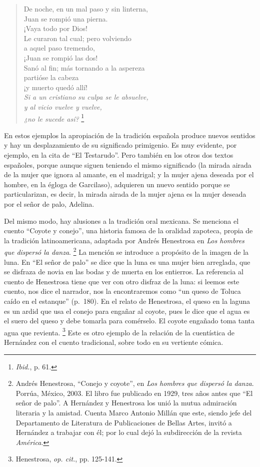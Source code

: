 \documentclass[14pt,twoside,final]{extbook} %
\let\oldfootnote\footnote
\renewcommand\footnote[1]{%
\oldfootnote{\hspace{1mm}#1}}
\begin{document}
\begin{verse}
De noche, en un mal paso y sin linterna, \\
Juan se rompió una pierna. \\
¡Vaya todo por Dios! \\
Le curaron tal cual; pero volviendo \\
a aquel paso tremendo, \\
¡Juan se rompió las dos! \\
Sanó al fin; más tornando a la aspereza \\
partióse la cabeza \\
¡y muerto quedó allí! \\
\emph{Si a un cristiano su culpa se le absuelve, \\
y al vicio vuelve y vuelve, \\
¿no le sucede así?}\footnote{\emph{Ibid.}, p. 61.}
\end{verse}
En estos ejemplos la apropiación de la tradición española produce nuevos sentidos y hay un desplazamiento de su significado primigenio. Es muy evidente, por ejemplo, en la cita de ``El Testarudo''. Pero también en los otros dos textos españoles, porque aunque siguen teniendo el mismo significado (la mirada airada de la mujer que ignora al amante, en el madrigal; y la mujer ajena deseada por el hombre, en la égloga de Garcilaso), adquieren un nuevo sentido porque se particularizan, es decir, la mirada airada de la mujer ajena es la mujer deseada por el señor de palo, Adelina.

Del mismo modo, hay alusiones a la tradición oral mexicana. Se menciona el cuento ``Coyote y conejo'', una historia famosa de la oralidad zapoteca, propia de la tradición latinoamericana, adaptada por Andrés Henestrosa en \emph{Los hombres que dispersó la danza}.\footnote{Andrés Henestrosa, ``Conejo y coyote'', en \emph{Los hombres que dispersó la danza}. Porrúa, México, 2003. El libro fue publicado en 1929, tres años antes que ``El señor de palo''. A Hernández y Henestrosa los unió la mutua admiración literaria y la amistad. Cuenta Marco Antonio Millán que este, siendo jefe del Departamento de Literatura de Publicaciones de Bellas Artes, invitó a Hernández a trabajar con él; por lo cual dejó la subdirección de la revista \emph{América}.} La mención se introduce a propósito de la imagen de la luna. En ``El señor de palo'' se dice que la luna es una mujer bien arreglada, que se disfraza de novia en las bodas y de muerta en los entierros. La referencia al cuento de Henestrosa tiene que ver con otro disfraz de la luna: si leemos este cuento, nos dice el narrador, nos la encontraremos como ``un queso de Toluca caído en el estanque'' (p.~180). En el relato de Henestrosa, el queso en la laguna es un ardid que usa el conejo para engañar al coyote, pues le dice que el agua es el suero del queso y debe tomarla para comérselo. El coyote engañado toma tanta agua que revienta.\footnote{Henestrosa, \emph{op. cit.}, pp. 125-141.} Este es otro ejemplo de la relación de la cuentística de Hernández con el cuento tradicional, sobre todo en su vertiente cómica.
\end{document}
